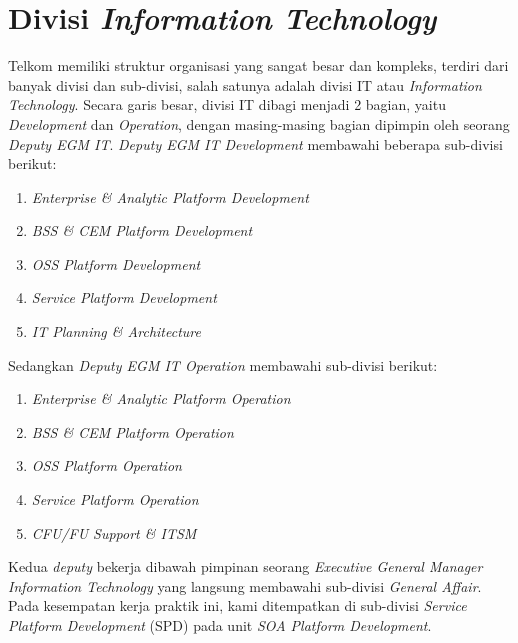 \section{Divisi \textit{Information Technology}}
\tab Telkom memiliki struktur organisasi yang sangat besar dan kompleks, terdiri dari banyak divisi dan sub-divisi, salah satunya adalah divisi IT atau \textit{Information Technology}.\cite{soa} Secara garis besar, divisi IT dibagi menjadi 2 bagian, yaitu \textit{Development} dan \textit{Operation}, dengan masing-masing bagian dipimpin oleh seorang \textit{Deputy EGM IT}. \textit{Deputy EGM IT Development} membawahi beberapa sub-divisi berikut:
\begin{enumerate}
	\item \textit{Enterprise \& Analytic Platform Development}
	\item \textit{BSS \& CEM Platform Development}
	\item \textit{OSS Platform Development}
	\item \textit{Service Platform Development}
	\item \textit{IT Planning \& Architecture}
\end{enumerate}
\tab Sedangkan \textit{Deputy EGM IT Operation} membawahi sub-divisi berikut:
\begin{enumerate}
	\item \textit{Enterprise \& Analytic Platform Operation}
	\item \textit{BSS \& CEM Platform Operation}
	\item \textit{OSS Platform Operation}
	\item \textit{Service Platform Operation}
	\item \textit{CFU/FU Support \& ITSM}
\end{enumerate}
\tab Kedua \textit{deputy} bekerja dibawah pimpinan seorang \textit{Executive General Manager Information Technology} yang langsung membawahi sub-divisi \textit{General Affair}.\\
\tab Pada kesempatan kerja praktik ini, kami ditempatkan di sub-divisi \textit{Service Platform Development} (SPD) pada unit \textit{SOA Platform Development}.

\cleardoublepage